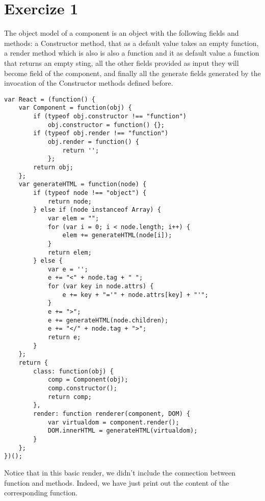 \documentclass[10pt]{article}
\begin{document}
\section*{Exercize 1}
The object model of a component is an object with the following fields and methods: a Constructor method, that as a default value takes an empty function, a render method which is also is also a function and it as default value a function that returns an empty sting, all the other fields provided as input they will become field of the component, and finally all the generate fields generated by the invocation of the Constructor methods defined before.
\begin{lstlisting}[caption=Simplest definition of react component and a basic render method]
var React = (function() {
    var Component = function(obj) {
        if (typeof obj.constructor !== "function")
            obj.constructor = function() {};
        if (typeof obj.render !== "function")
            obj.render = function() {
                return '';
            };
        return obj;
    };
    var generateHTML = function(node) {
        if (typeof node !== "object") {
            return node;
        } else if (node instanceof Array) {
            var elem = "";
            for (var i = 0; i < node.length; i++) {
                elem += generateHTML(node[i]);
            }
            return elem;
        } else {
            var e = '';
            e += "<" + node.tag + " ";
            for (var key in node.attrs) {
                e += key + "='" + node.attrs[key] + "'";
            }
            e += ">";
            e += generateHTML(node.children);
            e += "</" + node.tag + ">";
            return e;
        }
    };
    return {
        class: function(obj) {
            comp = Component(obj);
            comp.constructor();
            return comp;
        },
        render: function renderer(component, DOM) {
            var virtualdom = component.render();
            DOM.innerHTML = generateHTML(virtualdom);
        }
    };
})();
\end{lstlisting}
Notice that in this basic render, we didn't include the connection between function and methods. Indeed, we have just print out the content of the corresponding function. 
\end{document}
